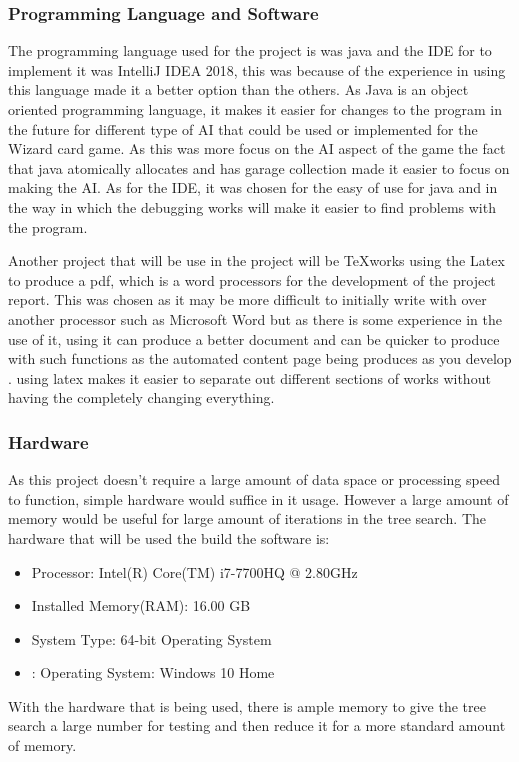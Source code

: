 \subsubsection{Programming Language and Software}
The programming language used for the project is was java\cite{javadescript} and the IDE for to implement it was IntelliJ IDEA 2018, this was because of the experience in using this language made it a better option than the others. As Java is an object oriented programming language, it makes it easier for changes to the program in the future for different type of AI that could be used or implemented for the Wizard card game\cite{java}. As this was more focus on the AI aspect of the game the fact that java atomically allocates and has garage collection made it easier to focus on making the AI. As for the IDE, it was chosen for the easy of use for java and in the way in which the debugging works will make it easier to find problems with the program. 

Another project that will be use in the project will be TeXworks\cite{tex} using the Latex to produce a pdf, which is a word processors for the development of the project report. This was chosen as it may be more difficult to initially write with over another processor such as Microsoft Word but as there is some experience in the use of it, using it can produce a better document and can be quicker to produce with such functions as the automated content page being produces as you develop \cite{Latex}. using latex makes it easier to separate out different sections of works without having the completely changing everything. 
\subsubsection{Hardware}
As this project doesn’t require a large amount of data space or processing speed to function, simple hardware would suffice in it usage. However a large amount of memory would be useful for large amount of iterations in the tree search. The hardware that will be used the build the software is:
\begin{itemize}
\item Processor: Intel(R) Core(TM) i7-7700HQ @ 2.80GHz
\item Installed Memory(RAM): 16.00 GB
\item System Type: 64-bit Operating System
\item: Operating System: Windows 10 Home
\end{itemize} 
With the hardware that is being used, there is ample memory to give the tree search a large number for testing and then reduce it for a more standard amount of memory.
